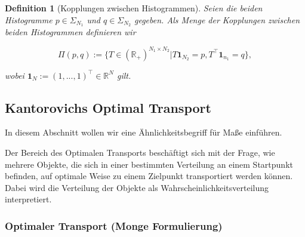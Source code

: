 \documentclass[11pt,a4paper]{article}
\newtheorem{definition}[theorem]{Definition}
\numberwithin{equation}{section}
\begin{document}
	
	\begin{definition}[Kopplungen zwischen Histogrammen]
		Seien die beiden Histogramme $p \in \Sigma_{N_1}$ und $q \in \Sigma_{N_2}$ gegeben.
		Als Menge der Kopplungen zwischen beiden Histogrammen definieren wir
		
		\begin{equation*}
		\Pi (p,q) := \lbrace T \in (\mathbb{R}_+)^{N_1 \times N_2} | T \boldsymbol{1}_{N_2} = p, T^\top \boldsymbol{1}_{n_1} = q \rbrace,
		\end{equation*}	
		
		wobei $\boldsymbol{1}_N := (1,...,1)^\top \in \mathbb{R}^{N}$ gilt.
	\end{definition}
	
	
	
	
	
	
	
	
	
	
	
	
	

	

	
	
	
	\subsection{Kantorovichs Optimal Transport}
	In diesem Abschnitt wollen wir eine Ähnlichkeitsbegriff für Maße einführen.
	
	Der Bereich des Optimalen Transports beschäftigt sich mit der Frage, wie mehrere Objekte, die sich in einer bestimmten Verteilung an einem Startpunkt befinden, auf optimale Weise zu einem Zielpunkt transportiert werden können. Dabei wird die Verteilung der Objekte als Wahrscheinlichkeitsverteilung interpretiert. 
	
	
	\subsubsection{Optimaler Transport (Monge Formulierung)}
	
\end{document}

